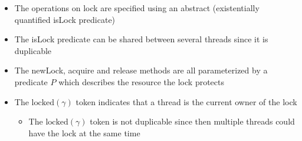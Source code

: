 \begin{itemize}
  \begin{itemize}
  	\item The operations on lock are specified using an abstract (existentially quantified isLock predicate)
    \item The isLock predicate can be shared between several threads since it is duplicable
    \item The newLock, acquire and release methods are all parameterized by a predicate $P$ which describes the resource the lock protects
    \item The $\text{locked}(\gamma)$ token indicates that a thread is the current owner of the lock
    \begin{itemize}
    	\item The $\text{locked}(\gamma)$ token is not duplicable since then multiple threads could have the lock at the same time
    \end{itemize}
  \end{itemize}
\end{itemize}

